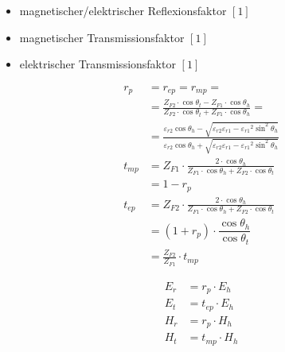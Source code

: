 \begin{itemize}
    \item magnetischer/elektrischer Reflexionsfaktor $[1]$
    \item magnetischer Transmissionsfaktor $[1]$
    \item elektrischer Transmissionsfaktor $[1]$
\end{itemize}
\begin{align*}
    r_p     & =  r_{e p} = r_{m p} =                                                                                                                                                                                                      \\
            & = \frac{Z_{F 2} \cdot \cos \theta_t-Z_{F 1} \cdot \cos \theta_h}{Z_{F 2} \cdot \cos \theta_t+Z_{F 1} \cdot \cos \theta_h} =                                                                                                 \\
            & = \frac{\varepsilon_{r2}\cos\theta_h-\sqrt{\varepsilon_{r2}\varepsilon_{r1}-{\varepsilon_{r1}}^2\sin^2\theta_h}}{\varepsilon_{r2}\cos\theta_h+\sqrt{{\varepsilon_{r2}\varepsilon_{r1}-{\varepsilon_{r1}}^2\sin^2\theta_h}}} \\
    t_{m p} & = Z_{F 1} \cdot \frac{2 \cdot \cos \theta_h}{Z_{F 1} \cdot \cos \theta_h+Z_{F 2} \cdot \cos \theta_t}                                                                                                                       \\
            & = 1-r_{p}                                                                                                                                                                                                                   \\
    t_{e p} & = Z_{F 2} \cdot \frac{2 \cdot \cos \theta_h}{Z_{F 1} \cdot \cos \theta_h+Z_{F 2} \cdot \cos \theta_t}                                                                                                                       \\
            & = (1 + r_{p}) \cdot \dfrac{\cos \theta_h}{\cos \theta_t}                                                                                                                                                                    \\
            & = \frac{Z_{F2}}{Z_{F1}}\cdot t_{mp}
\end{align*}

\begin{align*}
    E_{r} & = r_{p} \cdot E_{h}   \\
    E_{t} & = t_{e p} \cdot E_{h} \\
    H_{r} & = r_{p} \cdot H_{h}   \\
    H_{t} & = t_{m p} \cdot H_{h} \\
\end{align*}
